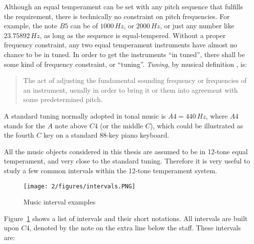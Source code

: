 Although an equal temperament can be set with any pitch sequence that fulfills the requirement, there is technically no constraint on pitch frequencies. For example, the note $B5$ can be of $1000\,Hz$, or $2000\,Hz$, or just any number like $23.75892\,Hz$, as long as the sequence is equal-tempered. Without a proper frequency constraint, any two equal temperament instruments have almost no chance to be in tuned. In order to get the instruments ``in tuned'', there shall be some kind of frequency constraint, or ``tuning''. {\it Tuning}, by musical definition \cite{randel1999harvard}, is:
\begin{quote}
The act of adjusting the fundamental sounding frequency or frequencies of an instrument, usually in order to bring it or them into agreement with some predetermined pitch.
\end{quote}
A standard tuning normally adopted in tonal music is $A4 = 440\,Hz$, where $A4$ stands for the $A$ note above $C4$ (or the middle $C$), which could be illustrated as the fourth $C$ key on a standard 88-key piano keyboard.

All the music objects considered in this thesis are assumed to be in 12-tone equal temperament, and very close to the standard tuning. Therefore it is very useful to study a few common intervals within the 12-tone temperament system.

\begin{figure}[htb]
\centering
\texttt{[image: 2/figures/intervals.PNG]}
\caption{Music interval examples}
\label{fig:2-mi}
\end{figure}

Figure~\ref{fig:2-mi} shows a list of intervals and their short notations. All intervals are built upon $C4$, denoted by the note on the extra line below the staff. These intervals are:

